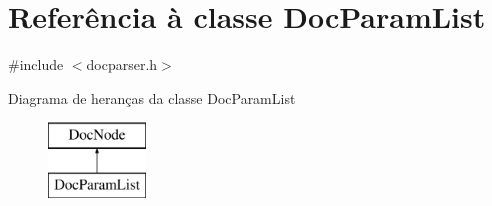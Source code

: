 \hypertarget{class_doc_param_list}{\section{Referência à classe Doc\-Param\-List}
\label{class_doc_param_list}
}


{\ttfamily \#include $<$docparser.\-h$>$}

Diagrama de heranças da classe Doc\-Param\-List\begin{figure}[H]
\begin{center}
\leavevmode
\includegraphics[height=2.000000cm]{class_doc_param_list}
\end{center}
\end{figure}
